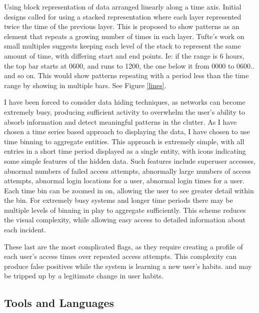 Using block representation of data arranged linearly along a time axis.
Initial designs called for using a stacked representation where each layer represented twice the time of the previous layer.
This is proposed to show patterns as an element that repeats a growing number of times in each layer.
Tufte's work on small multiples \cite{tufte1983visual} suggests keeping each level of the stack to represent the same amount of time, with differing start and end points. Ie: if the range is 6 hours, the top bar starts at 0600, and runs to 1200, the one below it from 0000 to 0600..  and so on. This would show patterns repeating with a period less than the time range by showing in multiple bars. See Figure \ref{lines}.

I have been forced to consider data hiding techniques, as networks can become extremely busy, producing sufficient activity to overwhelm the user's ability to absorb information and detect meaningful patterns in the clutter. As I have chosen a time series based approach to displaying the data, I have chosen to use time binning to aggregate entities. This approach is extremely simple, with all entries in a short time period displayed as a single entity, with icons indicating some simple features of the hidden data. Such features include superuser accesses, abnormal numbers of failed access attempts, abnormally large numbers of access attempts, abnormal login locations for a user, abnormal login times for a user. Each time bin can be zoomed in on, allowing the user to see greater detail within the bin. For extremely busy systems and longer time periods there may be multiple levels of binning in play to aggregate sufficiently. This scheme reduces the visual complexity, while allowing easy access to detailed information about each incident. 

These last are the most complicated flags, as they require creating a profile of each user's access times over repeated access attempts. This complexity can produce false positives while the system is learning a new user's habits. and may be tripped up by a legitimate change in user habits.

\subsection{Tools and Languages}\label{langs}


